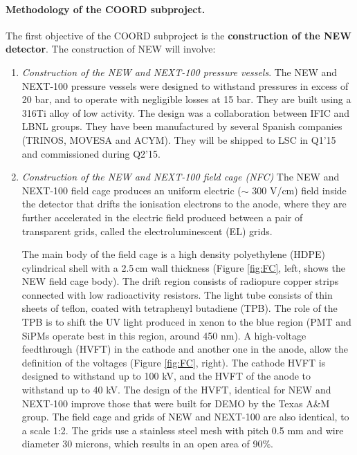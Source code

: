 \paragraph{Methodology of the COORD subproject.}

The first objective of the COORD subproject is the {\bf construction of the NEW detector}. The construction of NEW will involve:

\begin{enumerate}
\item {\em Construction of the NEW and NEXT-100 pressure vessels}.
The NEW and NEXT-100 pressure vessels were designed to withstand pressures in excess of 20 bar, and to operate with negligible losses at 15 bar. They are built using a 316Ti alloy of low activity. 
The design was a collaboration between IFIC and LBNL groups. They have been manufactured by several Spanish companies (TRINOS, MOVESA and ACYM). They will be shipped to LSC in Q1'15 and commissioned during Q2'15. 

\item {\em Construction of the NEW and NEXT-100 field cage (NFC)}
The NEW and NEXT-100 field cage produces an uniform electric ($\sim$ 300 V/cm) field inside the  detector that drifts the ionisation electrons to the anode, where they are further accelerated in the electric field produced between a pair of transparent grids, called the electroluminescent (EL) grids. 

The main body of the field cage is a high density polyethylene (HDPE) cylindrical shell with a 2.5\,cm wall thickness (Figure \ref{fig:FC}, left, shows the NEW field cage body).  The drift region consists of radiopure  copper strips connected with low radioactivity resistors.  The light tube consists of thin sheets of teflon, coated with tetraphenyl butadiene (TPB). The role of the TPB is to shift the UV light produced in xenon to the blue region (PMT and SiPMs operate best in this region, around 450 nm).  A high-voltage feedthrough (HVFT) in the cathode and another one in the anode, allow the definition of the voltages (Figure \ref{fig:FC}, right). The cathode HVFT is designed to withstand up to 100 kV, and the HVFT of the anode to withstand up to 40 kV. The design of the HVFT, identical for NEW and NEXT-100 improve those that were built for DEMO by the Texas A\&M group. The field cage and grids of NEW and NEXT-100 are also identical, to a scale 1:2. The grids use a stainless steel mesh with pitch 0.5 mm and wire diameter 30 microns, which results in an open area of 90\%. 


\end{enumerate}
